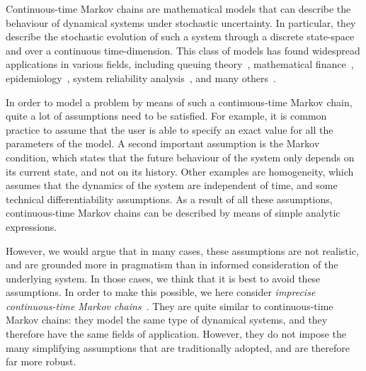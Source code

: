 \documentclass[10pt,a4paper]{paper}
\theoremstyle{definition}
\begin{document}
Continuous-time Markov chains are mathematical models that can describe the behaviour of dynamical systems under stochastic uncertainty. In particular, they describe the stochastic evolution of such a system through a discrete state-space and over a continuous time-dimension. This class of models has found widespread applications in various fields, including queuing theory~\cite{asmussen2008applied,bolch2006queueing}, mathematical finance~\cite{elliott2013default, rolski2009stochastic,sass2004optimizing}, epidemiology~\cite{ duffy1995estimation,jackson2003multistate, lemey2009reconstructing}, system reliability analysis~\cite{besnard2010approach,gokhale2004analysis, wang2007reliability}, and many others~\cite{yin2012continuous}.

In order to model a problem by means of such a continuous-time Markov chain, quite a lot of assumptions need to be satisfied. %
For example, it is common practice to assume that the user is able to specify an exact value for all the parameters of the model.
A second important assumption is the Markov condition, which states that the future behaviour of the system only depends on its current state, and not on its history. Other examples are homogeneity, which assumes that the dynamics of the system are independent of time, and some technical differentiability assumptions. 
As a result of all these assumptions, continuous-time Markov chains can be described by means of simple analytic expressions. 


However, we would argue that in many cases, these assumptions are not realistic, and are grounded more in pragmatism than in informed consideration of the underlying system.
In those cases, we think that it is best to avoid these assumptions. In order to make this possible, we here consider \emph{imprecise continuous-time Markov chains}~\cite{Skulj:2015cq,troffaes2015using}. They are quite similar to continuous-time Markov chains: they model the same type of dynamical systems, and they therefore have the same fields of application. However, they do not impose the many simplifying assumptions that are traditionally adopted, and are therefore far more robust.

\end{document}
